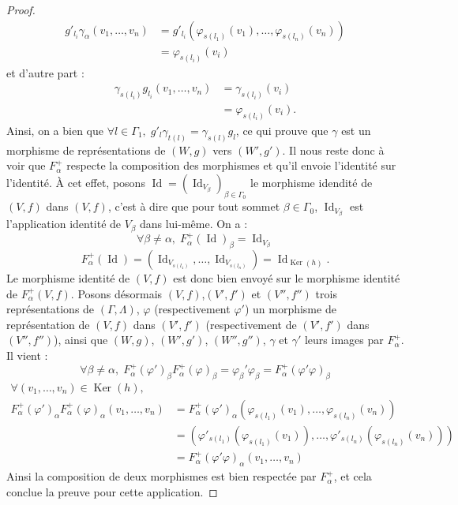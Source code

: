\documentclass[a4paper,10pt]{article}
\DeclareMathOperator{\Ker}{Ker}
\DeclareMathOperator{\Id}{Id}
\begin{document}
\begin{proof}
\[
\begin{array}{ll}
	g'_{l_{i}}\gamma_{\alpha}(v_{1},\dots,v_{n})&=g'_{l_{i}}(\varphi_{s(l_{1})}(v_{1}),\dots,\varphi_{s(l_{n})}(v_{n}))\\
	&=\varphi_{s(l_{i})}(v_{i})
\end{array}
\]
et d'autre part :
\[
\begin{array}{ll}
	\gamma_{s(l_{i})}g_{l_{i}}(v_{1},\dots,v_{n})&=\gamma_{s(l_{i})}(v_{i})\\
	&=\varphi_{s(l_{i})}(v_{i}).
\end{array}
\]
Ainsi, on a bien que $\forall l \in\Gamma_{1},\;g'_{l}\gamma_{t(l)}=\gamma_{s(l)}g_{l}$, ce qui prouve que $\gamma$ est un morphisme de représentations de $(W,g)$ vers $(W',g')$. Il nous reste donc à voir que $F_{\alpha}^{+}$ respecte la composition des morphismes et qu'il envoie l'identité sur l'identité. À cet effet, posons $\Id = (\Id_{V_{\beta}})_{\beta\in\Gamma_{0}}$ le morphisme idendité de $(V,f)$ dans $(V,f)$, c'est à dire que pour tout sommet $\beta\in\Gamma_{0}$, $\Id_{V_{\beta}}$ est l'application identité de $V_{\beta}$ dans lui-même. On a :
\[
	\forall \beta\neq\alpha,\;F_{\alpha}^{+}(\Id)_{\beta}=\Id_{V_{\beta}}
\]
\[
	F_{\alpha}^{+}(\Id)=(\Id_{V_{s(l_{1})}},\dots,\Id_{V_{s(l_{n})}})=\Id_{\Ker(h)}.
\]
Le morphisme identité de $(V,f)$ est donc bien envoyé sur le morphisme identité de $F_{\alpha}^{+}(V,f)$. Posons désormais $(V,f)$,$(V',f')$ et $(V'',f'')$ trois représentations de $(\Gamma,\Lambda)$, $\varphi$ (respectivement $\varphi '$) un morphisme de représentation de $(V,f)$ dans $(V',f')$ (respectivement de $(V',f')$ dans $(V'',f'')$), ainsi que $(W,g)$, $(W',g')$, $(W'',g'')$, $\gamma$ et $\gamma '$ leurs images par $F_{\alpha}^{+}$. Il vient :
\[
	\forall \beta\neq\alpha,\;F_{\alpha}^{+}(\varphi')_{\beta}F_{\alpha}^{+}(\varphi)_{\beta}=\varphi_{\beta}'\varphi_{\beta}=F_{\alpha}^{+}(\varphi'\varphi)_{\beta}
\]
\[
	\begin{array}{ll}
		\forall (v_{1},\dots,v_{n})\in\Ker(h),& \\
		F_{\alpha}^{+}(\varphi')_{\alpha}F_{\alpha}^{+}(\varphi)_{\alpha}(v_{1},\dots,v_{n})&=F_{\alpha}^{+}(\varphi')_{\alpha}(\varphi_{s(l_{1})}(v_{1}),\dots,\varphi_{s(l_{n})}(v_{n}))\\
		&=(\varphi'_{s(l_{1})}(\varphi_{s(l_{1})}(v_{1})),\dots,\varphi'_{s(l_{n})}(\varphi_{s(l_{n})}(v_{n})))\\
		&=F_{\alpha}^{+}(\varphi'\varphi)_{\alpha}(v_{1},\dots,v_{n})

	\end{array}
\]
Ainsi la composition de deux morphismes est bien respectée par $F_{\alpha}^{+}$, et cela conclue la preuve pour cette application.


\end{proof}
\end{document}
